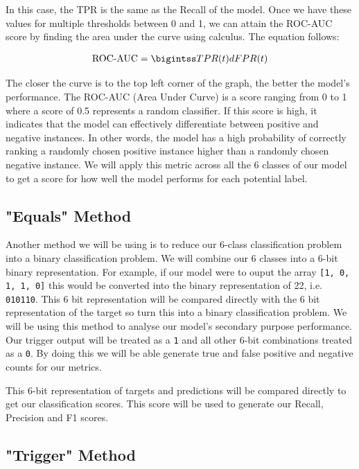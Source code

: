In this case, the TPR is the same as the Recall of the model. Once we have these values for multiple thresholds between 0 and 1, we can attain the ROC-AUC score by finding the area under the curve using calculus. The equation follows:

\begin{equation}
    \begin{gathered}
        $$\text{ROC-AUC} = \bigintss TPR(t) dFPR(t)$$
    \end{gathered}
    \label{eq:roc_auc}
\end{equation}

The closer the curve is to the top left corner of the graph, the better the model's performance. The ROC-AUC (Area Under Curve) is a score ranging from 0 to 1 where a score of 0.5 represents a random classifier. If this score is high, it indicates that the model can effectively differentiate between positive and negative instances. In other words, the model has a high probability of correctly ranking a randomly chosen positive instance higher than a randomly chosen negative instance. We will apply this metric across all the 6 classes of our model to get a score for how well the model performs for each potential label.

\subsection{"Equals" Method}

Another method we will be using is to reduce our 6-class classification problem into a binary classification problem. We will combine our 6 classes into a 6-bit binary representation. For example, if our model were to ouput the array \verb|[1, 0, 1, 1, 0]| this would be converted into the binary representation of 22, i.e. \verb|010110|. This 6 bit representation will be compared directly with the 6 bit representation of the target so turn this into a binary classification problem. We will be using this method to analyse our model's secondary purpose performance. Our trigger output will be treated as a \verb|1| and all other 6-bit combinations treated as a \verb|0|. By doing this we will be able generate true and false positive and negative counts for our metrics.

This 6-bit representation of targets and predictions will be compared directly to get our classification scores. This score will be used to generate our Recall, Precision and F1 scores.

\subsection{"Trigger" Method}

